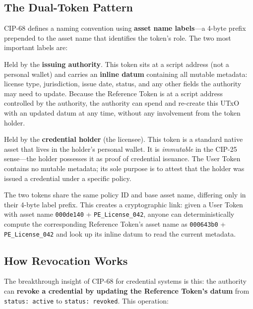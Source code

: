 \subsection{The Dual-Token Pattern}

CIP-68 defines a naming convention using \textbf{asset name labels}---a
4-byte prefix prepended to the asset name that identifies the token's role.
The two most important labels are:

\begin{description}[leftmargin=2em, style=nextline, nosep]
  \item[Label 100 --- Reference Token]
    Held by the \textbf{issuing authority}.  This token sits at a script
    address (not a personal wallet) and carries an \textbf{inline datum}
    containing all mutable metadata: license type, jurisdiction, issue date,
    status, and any other fields the authority may need to update.  Because
    the Reference Token is at a script address controlled by the authority,
    the authority can spend and re-create this UTxO with an updated datum at
    any time, without any involvement from the token holder.

  \item[Label 222 --- User Token]
    Held by the \textbf{credential holder} (the licensee).  This token is
    a standard native asset that lives in the holder's personal wallet.  It
    is \emph{immutable} in the CIP-25 sense---the holder possesses it as
    proof of credential issuance.  The User Token contains no mutable
    metadata; its sole purpose is to attest that the holder was issued a
    credential under a specific policy.
\end{description}

The two tokens share the same policy ID and base asset name, differing only
in their 4-byte label prefix.  This creates a cryptographic link: given a
User Token with asset name \texttt{000de140} + \texttt{PE\_License\_042},
anyone can deterministically compute the corresponding Reference Token's
asset name as \texttt{000643b0} + \texttt{PE\_License\_042} and look up its
inline datum to read the current metadata.

\subsection{How Revocation Works}

The breakthrough insight of CIP-68 for credential systems is this: the
authority can \textbf{revoke a credential by updating the Reference Token's
datum} from \texttt{status: active} to \texttt{status: revoked}.  This
operation:

